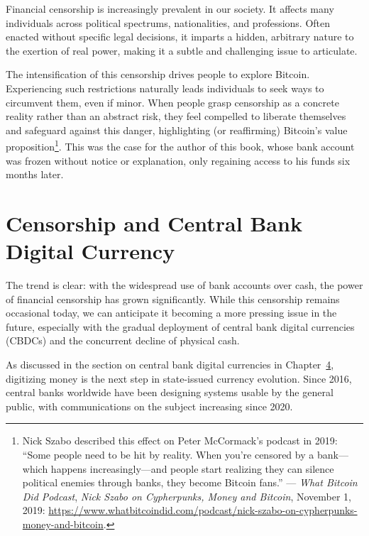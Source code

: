 \documentclass[
  a5paper,
  smalldemyvopaper,10pt,twoside,onecolumn,openright,extrafontsizes,hidelinks]{memoir}
\begin{document}
Financial censorship is increasingly prevalent in our society. It
affects many individuals across political spectrums, nationalities, and
professions. Often enacted without specific legal decisions, it imparts
a hidden, arbitrary nature to the exertion of real power, making it a
subtle and challenging issue to articulate.

The intensification of this censorship drives people to explore Bitcoin.
Experiencing such restrictions naturally leads individuals to seek ways
to circumvent them, even if minor. When people grasp censorship as a
concrete reality rather than an abstract risk, they feel compelled to
liberate themselves and safeguard against this danger, highlighting (or
reaffirming) Bitcoin's value proposition\footnote{Nick Szabo described
  this effect on Peter McCormack's podcast in 2019: ``Some people need
  to be hit by reality. When you're censored by a bank---which happens
  increasingly---and people start realizing they can silence political
  enemies through banks, they become Bitcoin fans.'' --- \emph{What
  Bitcoin Did Podcast}, \emph{Nick Szabo on Cypherpunks, Money and
  Bitcoin}, November 1, 2019:
  \url{https://www.whatbitcoindid.com/podcast/nick-szabo-on-cypherpunks-money-and-bitcoin}.}.
This was the case for the author of this book, whose bank account was
frozen without notice or explanation, only regaining access to his funds
six months later.

\section*{Censorship and Central Bank Digital
Currency}\label{censure-et-monnaie-numuxe9rique-de-banque-centrale}


The trend is clear: with the widespread use of bank accounts over cash,
the power of financial censorship has grown significantly. While this
censorship remains occasional today, we can anticipate it becoming a
more pressing issue in the future, especially with the gradual
deployment of central bank digital currencies (CBDCs) and the concurrent
decline of physical cash.

As discussed in the section on central bank digital currencies in
Chapter~\hyperref[ch:adversaire]{4}, digitizing money is the next step
in state-issued currency evolution. Since 2016, central banks worldwide
have been designing systems usable by the general public, with
communications on the subject increasing since 2020.
\end{document}
